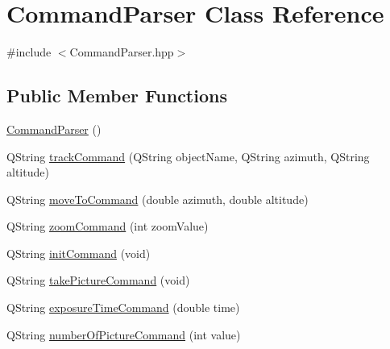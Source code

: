 \hypertarget{class_command_parser}{}\section{Command\+Parser Class Reference}
\label{class_command_parser}


{\ttfamily \#include $<$Command\+Parser.\+hpp$>$}

\subsection*{Public Member Functions}
\begin{DoxyCompactItemize}
\item 
\hyperlink{class_command_parser_a1fd17c361d85ec13c212cbac1999b9b3}{Command\+Parser} ()
\item 
Q\+String \hyperlink{class_command_parser_a79e2a2a51a39066c67aa16be2d3bb8cc}{track\+Command} (Q\+String object\+Name, Q\+String azimuth, Q\+String altitude)
\item 
Q\+String \hyperlink{class_command_parser_acd6a44d3d8c935825445ce264ec6a04e}{move\+To\+Command} (double azimuth, double altitude)
\item 
Q\+String \hyperlink{class_command_parser_a29eb25af7d4ab410453ed759f218f2ca}{zoom\+Command} (int zoom\+Value)
\item 
Q\+String \hyperlink{class_command_parser_a1862f57dc196373f3f6b1256a9686124}{init\+Command} (void)
\item 
Q\+String \hyperlink{class_command_parser_a9fd529d8ec75417afcff7c6ecb3908eb}{take\+Picture\+Command} (void)
\item 
Q\+String \hyperlink{class_command_parser_a9df48fe4f52977b9c7df8c120f49ea60}{exposure\+Time\+Command} (double time)
\item 
Q\+String \hyperlink{class_command_parser_aea0fc21f9919b299989cd221f799844f}{number\+Of\+Picture\+Command} (int value)
\end{DoxyCompactItemize}
